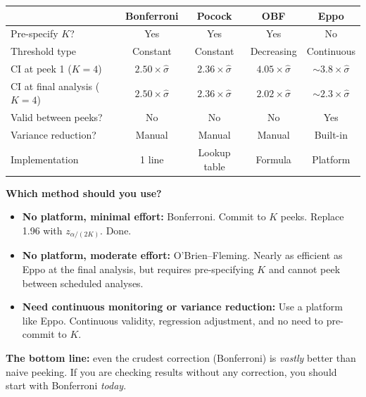 \documentclass[12pt, a4paper]{article}
\begin{document}
\begin{center}
\renewcommand{\arraystretch}{1.3}
\begin{tabular}{@{} l c c c c @{}}
\toprule
& \textbf{Bonferroni} & \textbf{Pocock} & \textbf{OBF} & \textbf{Eppo} \\
\midrule
Pre-specify $K$?
  & Yes & Yes & Yes & No \\
Threshold type
  & Constant & Constant & Decreasing & Continuous \\
CI at peek 1 ($K{=}4$)
  & $2.50\times\hat{\sigma}$ & $2.36\times\hat{\sigma}$
  & $4.05\times\hat{\sigma}$ & $\sim\!3.8\times\hat{\sigma}$ \\
CI at final analysis ($K{=}4$)
  & $2.50\times\hat{\sigma}$ & $2.36\times\hat{\sigma}$
  & $2.02\times\hat{\sigma}$ & $\sim\!2.3\times\hat{\sigma}$ \\
Valid between peeks?
  & No & No & No & Yes \\
Variance reduction?
  & Manual & Manual & Manual & Built-in \\
Implementation
  & 1 line & Lookup table & Formula & Platform \\
\bottomrule
\end{tabular}
\end{center}

\begin{keytakeaway}
\textbf{Which method should you use?}
\begin{itemize}[nosep]
  \item \textbf{No platform, minimal effort:} Bonferroni.  Commit to $K$
        peeks.  Replace 1.96 with $z_{\alpha/(2K)}$.  Done.
  \item \textbf{No platform, moderate effort:} O'Brien--Fleming.  Nearly as
        efficient as Eppo at the final analysis, but requires pre-specifying
        $K$ and cannot peek between scheduled analyses.
  \item \textbf{Need continuous monitoring or variance reduction:} Use a
        platform like Eppo.  Continuous validity, regression adjustment, and
        no need to pre-commit to $K$.
\end{itemize}

\textbf{The bottom line:} even the crudest correction (Bonferroni) is
\emph{vastly} better than naive peeking.  If you are checking results
without any correction, you should start with Bonferroni \emph{today}.
\end{keytakeaway}


\end{document}
